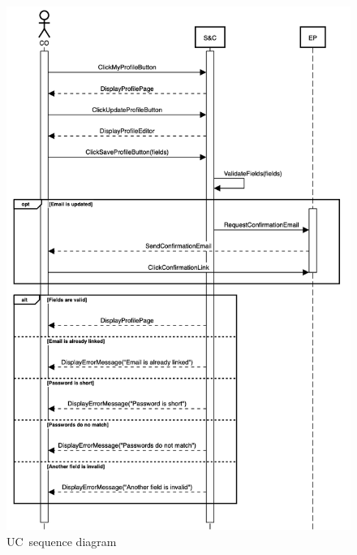 \begin{figure}
    \centering
    \includegraphics[width=14cm]{images/sequence-diagrams/company-updates-profile.png}
    \caption{UC\theuc\ sequence diagram}
\end{figure}


\clearpage

